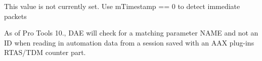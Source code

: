 \begin{DoxyRefList}
\item[\label{a00381__compatibility_notes000023}%
\hypertarget{a00381__compatibility_notes000023}{}%
Member \hyperlink{a00024_ab6fce0aee8fb08695ac8a112b3c3e7fa}{A\+A\+X\+\_\+\+C\+Midi\+Packet\+:\+:m\+Is\+Immediate} ]This value is not currently set. Use {\ttfamily m\+Timestamp == 0} to detect immediate packets  
\item[\label{a00381__compatibility_notes000024}%
\hypertarget{a00381__compatibility_notes000024}{}%
Member \hyperlink{a00033_a37efc08612535de4712bd59445ce8fbf}{A\+A\+X\+\_\+\+C\+Parameter$<$ T $>$\+:\+:A\+A\+X\+\_\+\+C\+Parameter} (A\+A\+X\+\_\+\+C\+Param\+I\+D identifier, const \hyperlink{a00113}{A\+A\+X\+\_\+\+I\+String} \&name, T default\+Value, const A\+A\+X\+\_\+\+I\+Taper\+Delegate$<$ T $>$ \&taper\+Delegate, const A\+A\+X\+\_\+\+I\+Display\+Delegate$<$ T $>$ \&display\+Delegate, bool automatable=false)]As of Pro Tools 10., D\+A\+E will check for a matching parameter N\+A\+M\+E and not an I\+D when reading in automation data from a session saved with an A\+A\+X plug-\/ins R\+T\+A\+S/\+T\+D\+M counter part. 


\end{DoxyRefList}
